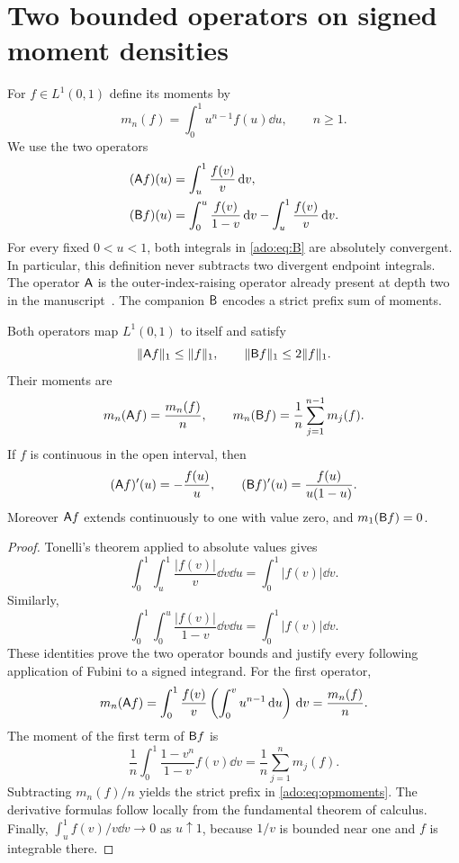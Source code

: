 \section{Two bounded operators on signed moment densities}
\label{ado:sec:operators}
For $f\in L^1(0,1)$ define its moments by
\[
 m_n(f)=\int_0^1u^{n-1}f(u)\dd u,\qquad n\ge1.
\]
We use the two operators
\begin{align}
 (\mathsf A f)(u)&=\int_u^1\frac{f(v)}v\,\mathrm d v,
 \label{ado:eq:A}\\
 (\mathsf B f)(u)&=\int_0^u\frac{f(v)}{1-v}\,\mathrm d v
              -\int_u^1\frac{f(v)}v\,\mathrm d v.
 \label{ado:eq:B}
\end{align}
For every fixed $0<u<1$, both integrals in \eqref{ado:eq:B} are
absolutely convergent. In particular, this definition never subtracts
two divergent endpoint integrals. The operator $\mathsf A$ is the
outer-index-raising operator already present at depth two in the
manuscript~\cite{repoSigned}. The companion $\mathsf B$ encodes a strict
prefix sum of moments.

\begin{lemma}
\label{ado:lem:operators}
Both operators map $L^1(0,1)$ to itself and satisfy
\begin{equation}\label{ado:eq:opnorm}
 \lVert\mathsf A f\rVert_1\le\lVert f\rVert_1,\qquad
 \lVert\mathsf B f\rVert_1\le2\lVert f\rVert_1.
\end{equation}
Their moments are
\begin{equation}\label{ado:eq:opmoments}
 m_n(\mathsf A f)=\frac{m_n(f)}n,\qquad
 m_n(\mathsf B f)=\frac1n\sum_{j=1}^{n-1}m_j(f).
\end{equation}
If $f$ is continuous in the open interval, then
\begin{equation}\label{ado:eq:opderivatives}
 (\mathsf A f)'(u)=-\frac{f(u)}u,\qquad
 (\mathsf B f)'(u)=\frac{f(u)}{u(1-u)}.
\end{equation}
Moreover $\mathsf A f$ extends continuously to one with value zero, and
$m_1(\mathsf B f)=0$.
\end{lemma}
\begin{proof}
Tonelli's theorem applied to absolute values gives
\[
 \int_0^1\int_u^1\frac{|f(v)|}{v}\dd v\dd u
 =\int_0^1|f(v)|\dd v.
\]
Similarly,
\[
 \int_0^1\int_0^u\frac{|f(v)|}{1-v}\dd v\dd u
 =\int_0^1|f(v)|\dd v.
\]
These identities prove the two operator bounds and justify every
following application of Fubini to a signed integrand. For the first
operator,
\[
 m_n(\mathsf A f)=\int_0^1\frac{f(v)}v
       \left(\int_0^v u^{n-1}\,\mathrm d u\right)\,\mathrm d v
 =\frac{m_n(f)}n.
\]
The moment of the first term of $\mathsf B f$ is
\[
 \frac1n\int_0^1\frac{1-v^n}{1-v}f(v)\dd v
 =\frac1n\sum_{j=1}^n m_j(f).
\]
Subtracting $m_n(f)/n$ yields the strict prefix in
\eqref{ado:eq:opmoments}. The derivative formulas follow locally from
the fundamental theorem of calculus. Finally,
$\int_u^1f(v)/v\dd v\to0$ as $u\uparrow1$, because $1/v$ is bounded
near one and $f$ is integrable there.
\end{proof}

